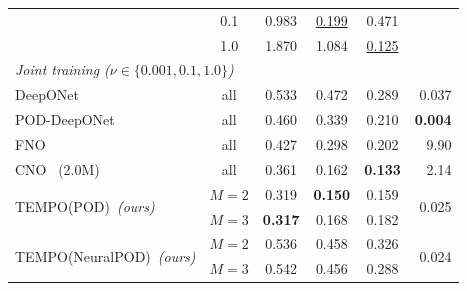 \documentclass[preprint,10pt]{elsarticle}
\begin{document}
\begin{table}[!htbp]
\begin{tabular}{l c c c c r}
  & 0.1   & 0.983 & \underline{0.199} & 0.471 & \\
  & 1.0   & 1.870 & 1.084 & \underline{0.125} & \\
\midrule
\multicolumn{6}{l}{\textit{Joint training ($\nu\in\{0.001,0.1,1.0\}$)}} \\[2pt]
DeepONet~\cite{Lu2019}
  & all & 0.533 & 0.472 & 0.289 & 0.037 \\
POD-DeepONet~\cite{Lu2022}
  & all & 0.460 & 0.339 & 0.210 & \textbf{0.004} \\
FNO~\cite{Li2021}
  & all & 0.427 & 0.298 & 0.202 & 9.90 \\
CNO~\cite{Raonic2023} \small{(2.0M)}
  & all & 0.361 & 0.162 & \textbf{0.133} & 2.14 \\
\multirow{2}{*}{TEMPO(POD)~\textit{(ours)}}
  & $M{=}2$ & 0.319 & \textbf{0.150} & 0.159 & \multirow{2}{*}{0.025} \\
  & $M{=}3$ & \textbf{0.317} & 0.168 & 0.182 & \\
\multirow{2}{*}{TEMPO(NeuralPOD)~\textit{(ours)}}
  & $M{=}2$ & 0.536 & 0.458 & 0.326 & \multirow{2}{*}{0.024} \\
  & $M{=}3$ & 0.542 & 0.456 & 0.288 & \\
\bottomrule
\end{tabular}
\end{table}
\end{document}
